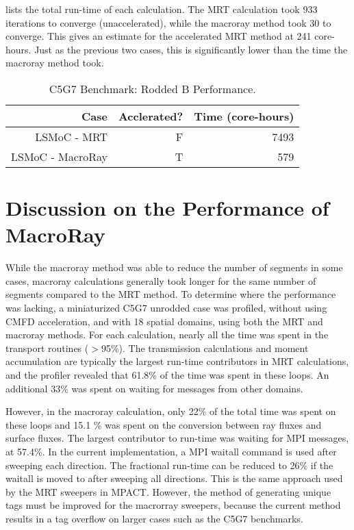 {{{{         lists the total run-time of each calculation.
        The \ac{MRT} calculation took 933 iterations to converge (unaccelerated), while the macroray method took 30 to converge.
        This gives an estimate for the accelerated \ac{MRT} method at 241 core-hours.
        Just as the previous two cases, this is significantly lower than the time the macroray method took.

        \begin{table}[htbp]
          \centering
          \caption{C5G7 Benchmark: Rodded B Performance. \label{tab:MR:C5G7:Rodded B-Performance}}
          \begin{tabular}{rrr}\toprule
            Case                        & Acclerated? & Time (core-hours)\\\midrule
            LSMoC - MRT                 & F & 7493\\
            LSMoC - MacroRay            & T & 579\\\bottomrule
          \end{tabular}
        \end{table}
      }
    }
  }

  \section{Discussion on the Performance of MacroRay}{\label{sec:Discussion one the Performance of MacroRay}
    While the macroray method was able to reduce the number of segments in some cases, macroray calculations generally took longer for the same number of segments compared to the \ac{MRT} method.
    To determine where the performance was lacking, a miniaturized C5G7 unrodded case was profiled, without using \ac{CMFD} acceleration, and with 18 spatial domains, using both the \ac{MRT} and macroray methods.
    For each calculation, nearly all the time was spent in the transport routines ($>$95\%).
    The transmission calculations and moment accumulation are typically the largest run-time contributors in \ac{MRT} calculations, and the profiler revealed that 61.8\% of the time was spent in these loops.
    An additional 33\% was spent on waiting for messages from other domains.

    However, in the macroray calculation, only 22\% of the total time was spent on these loops and 15.1 \% was spent on the conversion between ray fluxes and surface fluxes.
    The largest contributor to run-time was waiting for MPI messages, at 57.4\%.
    In the current implementation, a MPI waitall command is used after sweeping each direction.
    The fractional run-time can be reduced to 26\% if the waitall is moved to after sweeping all directions.
    This is the same approach used by the \ac{MRT} sweepers in MPACT.
    However, the method of generating unique tags must be improved for the macrorray sweepers, because the current method results in a tag overflow on larger cases such as the C5G7 benchmarks.

}}
